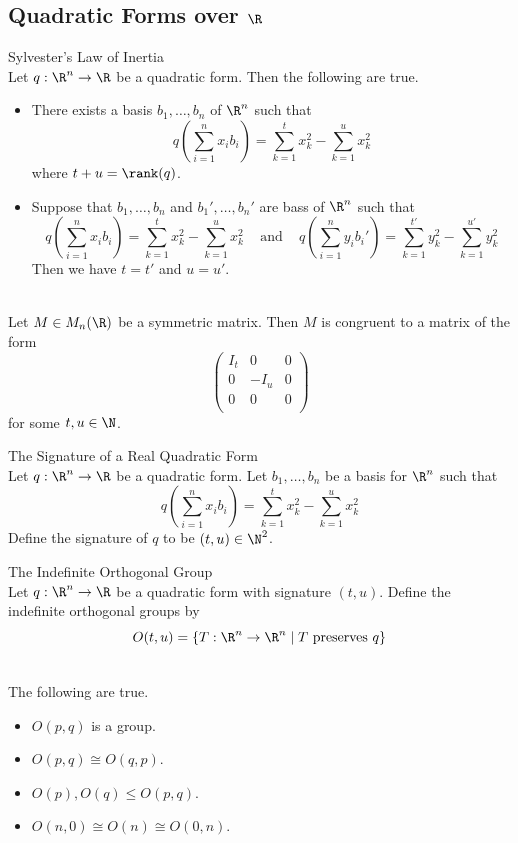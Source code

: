 \documentclass[a4paper]{article}
\begin{document}
\subsection{Quadratic Forms over $\R$}
\begin{thm}{Sylvester's Law of Inertia}{}\\
Let $q:\R^n\to\R$ be a quadratic form. Then the following are true. 
\begin{itemize}
\item There exists a basis $b_1,\dots,b_n$ of $\R^n$ such that $$q\left(\sum_{i=1}^nx_ib_i\right)=\sum_{k=1}^tx_k^2-\sum_{k=1}^ux_k^2$$ where $t+u=\rank(q)$. 
\item Suppose that $b_1,\dots,b_n$ and $b_1',\dots,b_n'$ are bass of $\R^n$ such that $$q\left(\sum_{i=1}^nx_ib_i\right)=\sum_{k=1}^tx_k^2-\sum_{k=1}^ux_k^2\;\;\;\text{ and }\;\;\;q\left(\sum_{i=1}^ny_ib_i'\right)=\sum_{k=1}^{t'}y_k^2-\sum_{k=1}^{u'}y_k^2$$ Then we have $t=t'$ and $u=u'$. 
\end{itemize}
\end{thm}

\begin{crl}{}{}\\
Let $M\in M_n(\R)$ be a symmetric matrix. Then $M$ is congruent to a matrix of the form $$\begin{pmatrix}
I_t & 0 & 0\\
0 & -I_u & 0\\
0 & 0 & 0\\
\end{pmatrix}$$ for some $t,u\in\N$. 
\end{crl}

\begin{defn}{The Signature of a Real Quadratic Form}{}\\
Let $q:\R^n\to\R$ be a quadratic form. Let $b_1,\dots,b_n$ be a basis for $\R^n$ such that $$q\left(\sum_{i=1}^nx_ib_i\right)=\sum_{k=1}^tx_k^2-\sum_{k=1}^ux_k^2$$ Define the signature of $q$ to be $(t,u)\in\N^2$. 
\end{defn}

\begin{defn}{The Indefinite Orthogonal Group}{}\\
Let $q:\R^n\to\R$ be a quadratic form with signature $(t,u)$. Define the indefinite orthogonal groups by $$O(t,u)=\{T:\R^n\to\R^n\;|\;T\text{ preserves }q\}$$
\end{defn}

\begin{lmm}{}{}\\
The following are true. 
\begin{itemize}
\item $O(p,q)$ is a group. 
\item $O(p,q)\cong O(q,p)$. 
\item $O(p),O(q)\leq O(p,q)$. 
\item $O(n,0)\cong O(n)\cong O(0,n)$. 
\end{itemize}
\end{lmm}
\end{document}
